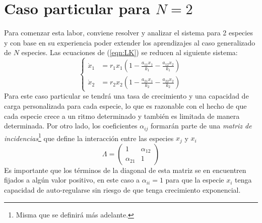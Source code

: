 \section{Caso particular para $N=2$}
Para comenzar esta labor, conviene resolver y analizar el sistema para 2 especies y con base en su experiencia poder extender los aprendizajes al caso generalizado de $N$ especies. Las ecuaciones de (\ref{eqn:LK}) se reducen al siguiente sistema:
$$
\begin{cases}
	\dot{x}_1&=r_1x_1\left (1-\frac{a_{11}x_1}{k_1}-\frac{a_{12}x_2}{k_1}\right )\\
	\dot{x}_2&=r_2x_2\left (1-\frac{a_{21}x_1}{k_2}-\frac{a_{22}x_2}{k_2}\right )
\end{cases}
$$
Para este caso particular se tendrá una tasa de crecimiento y una capacidad de carga personalizada para cada especie, lo que es razonable con el hecho de que cada especie crece a un ritmo determinado y también es limitada de manera determinada. Por otro lado, los coeficientes $\alpha_{ij}$ formarán parte de una \textit{matriz de incidencias}\footnote{Misma que se definirá más adelante.} que define la interacción entre las especies $x_j$ y $x_i$
\begin{equation}\label{eqn:mIncidencias}
	\Lambda=
	\begin{pmatrix}
		1 & \alpha_{12}\\
		\alpha_{21} &1
	\end{pmatrix}
\end{equation}
Es importante que los términos de la diagonal de esta matriz se en encuentren fijados a algún valor positivo, en este caso a $\alpha_{ii}=1$ para que la especie $x_i$ tenga capacidad de auto-regularse sin riesgo de que tenga crecimiento exponencial.

